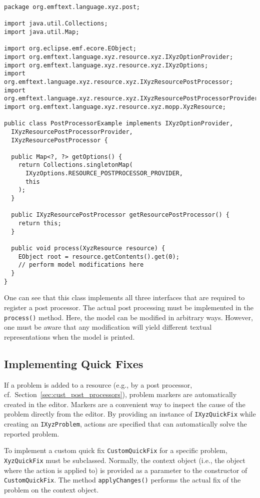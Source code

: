 \lstset{language=Java}
\begin{lstlisting}
package org.emftext.language.xyz.post;

import java.util.Collections;
import java.util.Map;

import org.eclipse.emf.ecore.EObject;
import org.emftext.language.xyz.resource.xyz.IXyzOptionProvider;
import org.emftext.language.xyz.resource.xyz.IXyzOptions;
import org.emftext.language.xyz.resource.xyz.IXyzResourcePostProcessor;
import org.emftext.language.xyz.resource.xyz.IXyzResourcePostProcessorProvider;
import org.emftext.language.xyz.resource.xyz.mopp.XyzResource;

public class PostProcessorExample implements IXyzOptionProvider, 
  IXyzResourcePostProcessorProvider, 
  IXyzResourcePostProcessor {

  public Map<?, ?> getOptions() {
    return Collections.singletonMap(
      IXyzOptions.RESOURCE_POSTPROCESSOR_PROVIDER, 
      this
    );
  }

  public IXyzResourcePostProcessor getResourcePostProcessor() {
    return this;
  }

  public void process(XyzResource resource) {
    EObject root = resource.getContents().get(0);
    // perform model modifications here
  }
}
\end{lstlisting}

One can see that this class implements all three interfaces that are required to
register a post processor. The actual post processing must be implemented in the
\texttt{process()} method. Here, the model can be modified in arbitrary ways.
However, one must be aware that any modification will yield different textual
representations when the model is printed.

\subsection{Implementing Quick Fixes}
\label{sec:cust_quick_fixes}

If a problem is added to a resource (e.g., by a post processor, cf.~Section~\ref{sec:cust_post_processors}), 
problem markers are automatically created in the editor. Markers are a convenient 
way to inspect the cause of the problem directly from the editor. By providing an 
instance of \texttt{IXyzQuickFix} while creating an \texttt{IXyzProblem}, actions 
are specified that can automatically solve the reported problem.

To implement a custom quick fix \texttt{CustomQuickFix} for a specific problem, 
\texttt{XyzQuickFix} must be subclassed. Normally, the context object (i.e., the 
object where the action is applied to) is provided as a parameter to the constructor 
of \texttt{CustomQuickFix}. The method \texttt{applyChanges()} performs the actual
fix of the problem on the context object.

